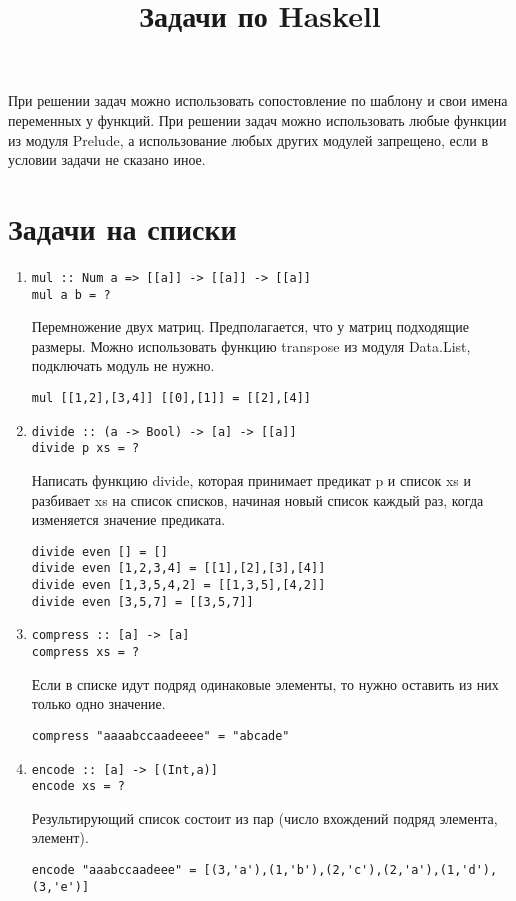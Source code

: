 \documentclass[a4paper,10pt]{article}
\begin{document}
\lstset{language=Haskell} 
\setcounter{secnumdepth}{0}
\title{Задачи по Haskell}
\date{}
\maketitle
При решении задач можно использовать сопостовление по шаблону и свои имена переменных у функций.
При решении задач можно использовать любые функции из модуля Prelude, а использование любых других
модулей запрещено, если в условии задачи не сказано иное.
\section{Задачи на списки}
\begin{enumerate}

\item {
\begin{lstlisting}
mul :: Num a => [[a]] -> [[a]] -> [[a]] 
mul a b = ?
\end{lstlisting}
Перемножение двух матриц. Предполагается, что у матриц подходящие размеры. Можно использовать
функцию transpose из модуля Data.List, подключать модуль не нужно.
\begin{lstlisting}
mul [[1,2],[3,4]] [[0],[1]] = [[2],[4]]
\end{lstlisting}
}

\item {
\begin{lstlisting}
divide :: (a -> Bool) -> [a] -> [[a]]
divide p xs = ?
\end{lstlisting}
Написать функцию divide, которая принимает предикат p и список xs и разбивает xs на список
списков, начиная новый список каждый раз, когда изменяется значение предиката.
\begin{lstlisting}
divide even [] = []
divide even [1,2,3,4] = [[1],[2],[3],[4]]
divide even [1,3,5,4,2] = [[1,3,5],[4,2]]
divide even [3,5,7] = [[3,5,7]]
\end{lstlisting}
}

\item {
\begin{lstlisting}
compress :: [a] -> [a]
compress xs = ?
\end{lstlisting}
Если в списке идут подряд одинаковые элементы, то нужно оставить из них только одно значение.
\begin{lstlisting}
compress "aaaabccaadeeee" = "abcade"
\end{lstlisting}
}

\item {
\begin{lstlisting}
encode :: [a] -> [(Int,a)]
encode xs = ?
\end{lstlisting}
Результирующий список состоит из пар (число вхождений подряд элемента, элемент).
\begin{lstlisting}
encode "aaabccaadeee" = [(3,'a'),(1,'b'),(2,'c'),(2,'a'),(1,'d'),(3,'e')]
\end{lstlisting}
}


\end{enumerate}
\end{document}
